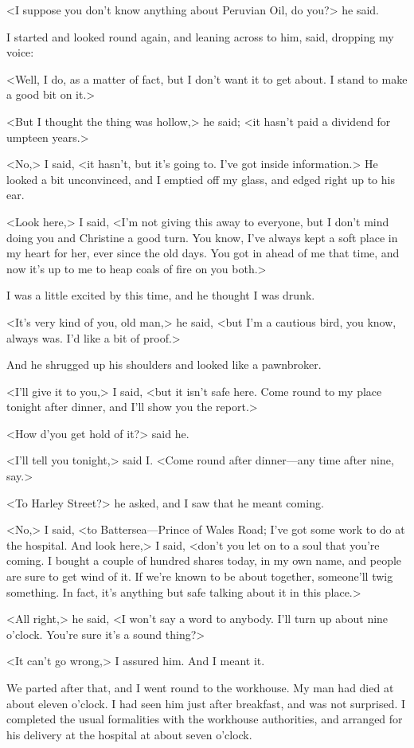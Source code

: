 <I suppose you don't know anything about Peruvian Oil, do you?> he said.

I started and looked round again, and leaning across to him, said, dropping my voice:

<Well, I do, as a matter of fact, but I don't want it to get about. I stand to make a good bit on it.>

<But I thought the thing was hollow,> he said; <it hasn't paid a dividend for umpteen years.>

<No,> I said, <it hasn't, but it's going to. I've got inside information.> He looked a bit unconvinced, and I emptied off my glass, and edged right up to his ear.

<Look here,> I said, <I'm not giving this away to everyone, but I don't mind doing you and Christine a good turn. You know, I've always kept a soft place in my heart for her, ever since the old days. You got in ahead of me that time, and now it's up to me to heap coals of fire on you both.>

I was a little excited by this time, and he thought I was drunk.

<It's very kind of you, old man,> he said, <but I'm a cautious bird, you know, always was. I'd like a bit of proof.>

And he shrugged up his shoulders and looked like a pawnbroker.

<I'll give it to you,> I said, <but it isn't safe here. Come round to my place tonight after dinner, and I'll show you the report.>

<How d'you get hold of it?> said he.

<I'll tell you tonight,> said I\@. <Come round after dinner—any time after nine, say.>

<To Harley Street?> he asked, and I saw that he meant coming.

<No,> I said, <to Battersea—Prince of Wales Road; I've got some work to do at the hospital. And look here,> I said, <don't you let on to a soul that you're coming. I bought a couple of hundred shares today, in my own name, and people are sure to get wind of it. If we're known to be about together, someone'll twig something. In fact, it's anything but safe talking about it in this place.>

<All right,> he said, <I won't say a word to anybody. I'll turn up about nine o'clock. You're sure it's a sound thing?>

<It can't go wrong,> I assured him. And I meant it.

We parted after that, and I went round to the workhouse. My man had died at about eleven o'clock. I had seen him just after breakfast, and was not surprised. I completed the usual formalities with the workhouse authorities, and arranged for his delivery at the hospital at about seven o'clock.

